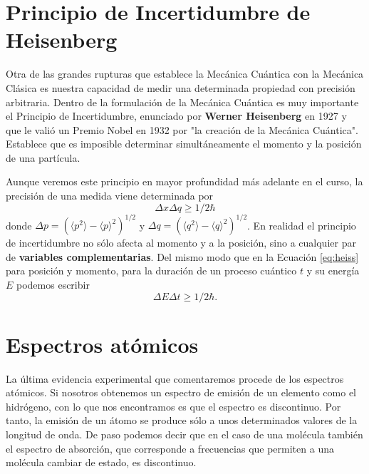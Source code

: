\section{Principio de Incertidumbre de Heisenberg}
Otra de las grandes rupturas que establece la Mecánica Cuántica 
con la Mecánica Clásica es nuestra capacidad de medir una 
determinada propiedad con precisión arbitraria. Dentro de la 
formulación de la Mecánica Cuántica es muy importante el Principio
de Incertidumbre, enunciado por \textbf{Werner Heisenberg} en 1927
y que le valió un Premio Nobel en 1932 por "la creación de la Mecánica
Cuántica". 
Establece que es imposible determinar simultáneamente el momento 
y la posición de una partícula. 

Aunque veremos este principio en 
mayor profundidad más adelante en el curso, la precisión de una
medida viene determinada por
\begin{equation}
    \Delta x\Delta q\geq 1/2\hbar\label{eq:heiss}
\end{equation}
donde $\Delta p=(\langle p^2\rangle-\langle p \rangle^2)^{1/2}$ y
$\Delta q=(\langle q^2\rangle-\langle q\rangle^2)^{1/2}$. En realidad
el principio de incertidumbre no sólo afecta al momento y a la posición, sino a 
cualquier par de \textbf{variables complementarias}. Del mismo modo
que en la Ecuación \ref{eq:heiss} para posición y momento, para 
la duración de un proceso cuántico $t$ y su energía $E$ podemos
escribir
\begin{equation}
    \Delta E\Delta t\geq 1/2\hbar.
\end{equation}

\section{Espectros atómicos}
La última evidencia experimental que comentaremos procede de los 
espectros atómicos. Si nosotros obtenemos un espectro de emisión
de un elemento como el hidrógeno, con lo que nos encontramos
es que el espectro es discontinuo. Por tanto, la emisión de un
átomo se produce sólo a unos determinados valores de la longitud
de onda. De paso podemos decir que en el caso de una molécula 
también el espectro de absorción, que corresponde a frecuencias
que permiten a una molécula cambiar de estado, es discontinuo.

